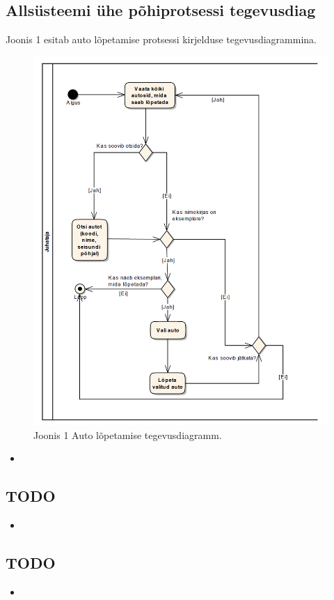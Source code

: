 \documentclass{report}
\begin{document}
\subsection{Allsüsteemi ühe põhiprotsessi tegevusdiag}

Joonis 1 esitab auto lõpetamise protsessi kirjelduse tegevusdiagrammina. 
\begin{figure}[H]
	\includegraphics[scale=0.6]{joonis1}
	\caption{Joonis 1 Auto lõpetamise tegevusdiagramm.}
\end{figure}



\begin{itemize}
	\item 
\end{itemize}

\subsection{TODO}
\begin{itemize}
	\item 
\end{itemize}

\subsection{TODO}
\begin{itemize}
	\item 
\end{itemize}
\end{document}

